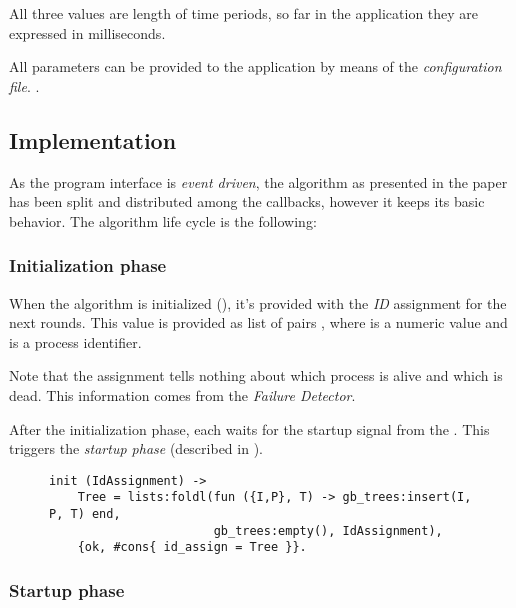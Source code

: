 All three values are length of time periods, so far in the application
they are expressed in milliseconds.

All parameters can be provided to the application by means of the
\emph{configuration file}. .



\subsection{Implementation}

As the program interface is \emph{event driven}, the algorithm as
presented in the paper has been split and distributed among the callbacks,
however it keeps its basic behavior. The algorithm life cycle is the
following:

\subsubsection{Initialization phase}

When the algorithm is initialized (), it's provided
with the \emph{ID} assignment for the next rounds. This value is provided
as list of pairs , where  is a numeric value
and  is a process identifier.

Note that the assignment tells nothing about which process is alive and
which is dead. This information comes from the \emph{Failure Detector}.

After the initialization phase, each  waits for the startup
signal from the . This triggers the \emph{startup phase}
(described in ).

\begin{figure}[hbt]
\begin{lstlisting}[caption={initialization phase},
                   label={code:ConsInit}]
init (IdAssignment) ->
    Tree = lists:foldl(fun ({I,P}, T) -> gb_trees:insert(I, P, T) end,
                       gb_trees:empty(), IdAssignment),
    {ok, #cons{ id_assign = Tree }}.
\end{lstlisting}
\end{figure}

\subsubsection{Startup phase} \label{subsub:ConsStartup}

